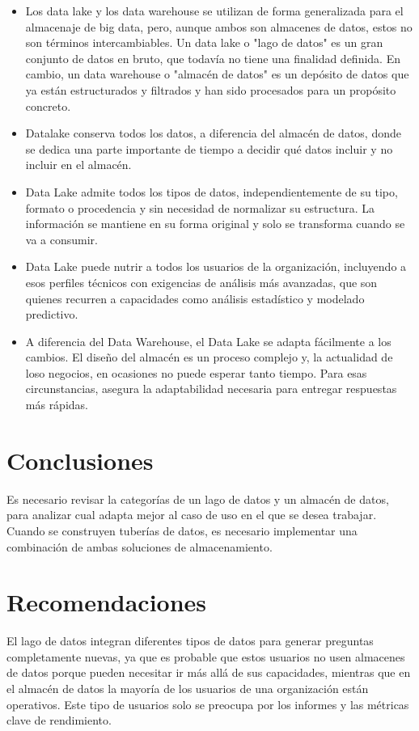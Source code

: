 \documentclass[twoside,twocolumn]{article}
\begin{document}
\begin{itemize}
    \item  Los data lake y los data warehouse se utilizan de forma generalizada para el almacenaje de big data, pero, aunque ambos son almacenes de datos, estos no son términos intercambiables. Un data lake o "lago de datos" es un gran conjunto de datos en bruto, que todavía no tiene una finalidad definida. En cambio, un data warehouse o "almacén de datos" es un depósito de datos que ya están estructurados y filtrados y han sido procesados para un propósito concreto.
    \item   Datalake conserva todos los datos, a diferencia del almacén de datos, donde se dedica una parte importante de tiempo a decidir qué datos incluir y no incluir en el almacén.
    \item Data Lake admite todos los tipos de datos, independientemente de su tipo, formato o procedencia y sin necesidad de normalizar su estructura. La información se mantiene en su forma original y solo se transforma cuando se va a consumir.
    \item   Data Lake puede nutrir a todos los usuarios de la organización, incluyendo a esos perfiles técnicos con exigencias de análisis más avanzadas, que son quienes recurren a capacidades como análisis estadístico y modelado predictivo.
    \item   A diferencia del Data Warehouse, el Data Lake se adapta fácilmente a los cambios. El diseño del almacén es un proceso complejo y, la actualidad de loso negocios, en ocasiones no puede esperar tanto tiempo. Para esas circunstancias, asegura la adaptabilidad necesaria para entregar respuestas más rápidas.
\end{itemize}


\section{Conclusiones}

Es necesario revisar la categorías de un lago de datos y un almacén de datos, para analizar cual adapta mejor al caso de uso en el que se desea trabajar.
Cuando se construyen tuberías de datos, es necesario implementar una combinación de ambas soluciones de almacenamiento.


\section{Recomendaciones}
 El lago de datos integran diferentes tipos de datos para generar preguntas completamente nuevas, ya que es probable que estos usuarios no usen almacenes de datos porque pueden necesitar ir más allá de sus capacidades, mientras que en el almacén de datos la mayoría de los usuarios de una organización están operativos. Este tipo de usuarios solo se preocupa por los informes y las métricas clave de rendimiento.
\end{document}
